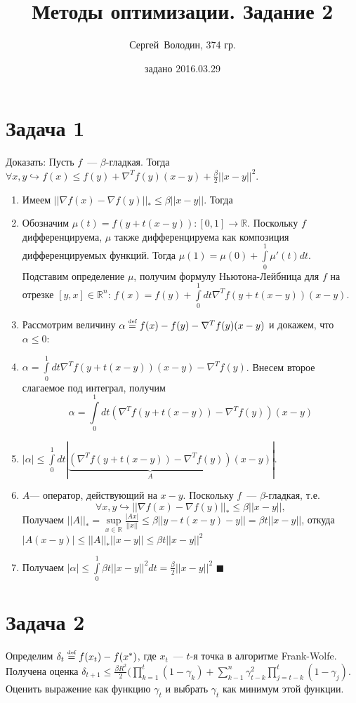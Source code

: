 \documentclass[a4paper]{article}
\title{Методы оптимизации. Задание 2}
\date{задано 2016.03.29}
\author{Сергей~Володин, 374 гр.}
\def\eqdef{\overset{\mbox{\tiny def}}{=}}
\begin{document}
\maketitle
\section*{Задача 1}
Доказать: Пусть $f$~--- $\beta$-гладкая. Тогда $\forall x,y \hookrightarrow f(x)\leqslant f(y)+\nabla^Tf(y)(x-y)+\frac{\beta}{2}||x-y||^2$.

\begin{enumerate}
	\item Имеем $||\nabla f(x)-\nabla f(y)||_*\leqslant \beta ||x-y||$. Тогда 
	\item Обозначим $\mu(t)=f(y+t(x-y))\colon [0,1]\to\mathbb{R}$. Поскольку $f$ дифференцируема, $\mu$ также дифференцируема как композиция дифференцируемых функций. Тогда $\mu(1)=\mu(0)+\int\limits_0^1\mu'(t)dt$. Подставим определение $\mu$, получим формулу Ньютона-Лейбница для $f$ на отрезке $[y,x]\in\mathbb{R}^n$: $f(x)=f(y)+\int\limits_0^1 dt \nabla^Tf(y+t(x-y))(x-y)$.
	\item Рассмотрим величину $\alpha\eqdef f(x)-f(y)-\nabla^Tf(y)(x-y)$ и докажем, что $\alpha\leqslant 0$:
	\item $\alpha=\int\limits_0^1 dt \nabla^Tf(y+t(x-y))(x-y)-\nabla^Tf(y)$. Внесем второе слагаемое под интеграл, получим
	$$\alpha=\int\limits_0^1 dt \left(\nabla^T f(y+t(x-y))-\nabla^T f(y)\right)(x-y)$$
	\item $|\alpha|\leqslant\int\limits_0^1 dt |\underbrace{\left(\nabla^T f(y+t(x-y))-\nabla^T f(y)\right)}_{A}(x-y)|$.
	\item $A$--- оператор, действующий на $x-y$. Поскольку $f$~--- $\beta$-гладкая, т.е. $$\forall x,y\hookrightarrow ||\nabla f(x) - \nabla f(y)||_*\leqslant \beta ||x-y||,$$
	Получаем $||A||_*=\sup\limits_{x\in\mathbb{R}}\frac{|Ax|}{||x||}\leqslant \beta ||y-t(x-y)-y||=\beta t ||x-y||$, откуда $|A(x-y)|\leqslant ||A||_*||x-y||\leqslant \beta t||x-y||^2$
	\item Получаем $|\alpha|\leqslant \int\limits_0^1 \beta t ||x-y||^2 dt = \frac{\beta}{2}||x-y||^2$ $\blacksquare$
\end{enumerate}
\section*{Задача 2}
Определим $\delta_t\eqdef f(x_t)-f(x^*)$, где $x_t$~--- $t$-я точка в алгоритме Frank-Wolfe. Получена оценка $\delta_{t+1}\leqslant \frac{\beta R^2}{2}(\prod\limits_{k=1}^t(1-\gamma_k)+\sum\limits_{k-1}^n\gamma^2_{t-k}\prod\limits_{j=t-k}^t(1-\gamma_j)$. Оценить выражение как функцию $\gamma_t$ и выбрать $\gamma_t$ как минимум этой функции.
\end{document}
